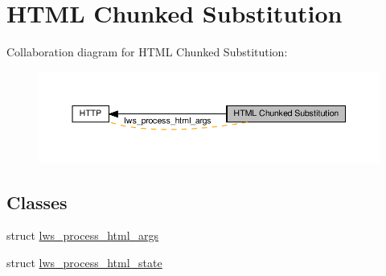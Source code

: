 \hypertarget{group__html-chunked-substitution}{}\section{H\+T\+ML Chunked Substitution}
\label{group__html-chunked-substitution}
Collaboration diagram for H\+T\+ML Chunked Substitution\+:
\nopagebreak
\begin{figure}[H]
\begin{center}
\leavevmode
\includegraphics[width=350pt]{group__html-chunked-substitution}
\end{center}
\end{figure}
\subsection*{Classes}
\begin{DoxyCompactItemize}
\item 
struct \hyperlink{structlws__process__html__args}{lws\+\_\+process\+\_\+html\+\_\+args}
\item 
struct \hyperlink{structlws__process__html__state}{lws\+\_\+process\+\_\+html\+\_\+state}
\end{DoxyCompactItemize}
